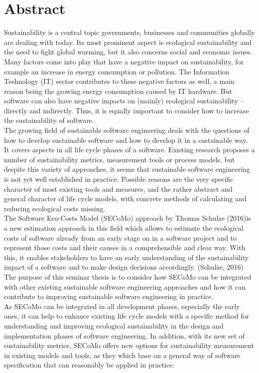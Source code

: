 \chapter{Abstract}
Sustainability is a central topic governments, businesses and communities globally are dealing with today. Its most prominent aspect is ecological sustainability and the need to fight global warming, but it also concerns social and economic issues. Many factors come into play that have a negative impact on sustainability, for example an increase in energy consumption or pollution. The Information Technology (IT) sector contributes to these negative factors as well, a main reason being the growing energy consumption caused by IT hardware. But software can also have negative impacts on (mainly) ecological sustainability – directly and indirectly. Thus, it is equally important to consider how to increase the sustainability of software.\\
The growing field of sustainable software engineering deals with the questions of how to develop sustainable software and how to develop it in a sustainable way. It covers aspects in all life cycle phases of a software. Existing research proposes a number of sustainability metrics, measurement tools or process models, but despite this variety of approaches, it seems that sustainable software engineering is not yet well established in practice. Possible reasons are the very specific character of most existing tools and measures, and the rather abstract and general character of life cycle models, with concrete methods of calculating and reducing ecological costs missing.\\
The Software Eco-Costs Model (SECoMo) approach by Thomas Schulze (2016)is a new estimation approach in this field which allows to estimate the ecological costs of software already from an early stage on in a software project and to represent those costs and their causes in a comprehensible and clear way. With this, it enables stakeholders to have an early understanding of the sustainability impact of a software and to make design decisions accordingly. (Schulze, 2016) %
\\ %
The purpose of this seminar thesis is to consider how SECoMo can be integrated with other existing sustainable software engineering approaches and how it can contribute to improving sustainable software engineering in practice.\\
As SECoMo can be integrated in all development phases, especially the early ones, it can help to enhance existing life cycle models with a specific method for understanding and improving ecological sustainability in the design and implementation phases of software engineering. In addition, with its new set of sustainability metrics, SECoMo offers new options for sustainability measurement in existing models and tools, as they which base on a general way of software specification that can reasonably be applied in practice.